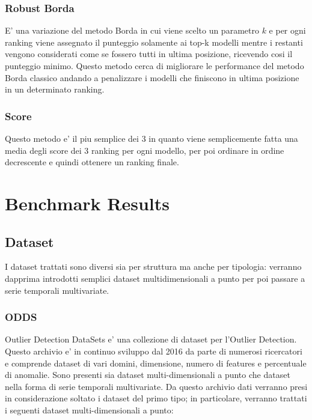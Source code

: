 \subsubsection{Robust Borda}
E' una variazione del metodo Borda in cui viene scelto un parametro $k$ e per ogni ranking viene assegnato il punteggio solamente ai top-k modelli mentre i restanti vengono considerati come se fossero tutti in ultima posizione, ricevendo cosi il punteggio minimo. Questo metodo cerca di migliorare le performance del metodo Borda classico andando a penalizzare i modelli che finiscono in ultima posizione in un determinato ranking.
\subsubsection{Score}
Questo metodo e' il piu semplice dei 3 in quanto viene semplicemente fatta una media degli score dei 3 ranking per ogni modello, per poi ordinare in ordine decrescente e quindi ottenere un ranking finale.

\section{Benchmark Results}
\subsection{Dataset}
I dataset trattati sono diversi sia per struttura ma anche per tipologia: verranno dapprima introdotti semplici dataset multidimensionali a punto per poi passare a serie temporali multivariate. 

\subsubsection{ODDS}
Outlier Detection DataSets e' una collezione di dataset per l'Outlier Detection. Questo archivio e' in continuo sviluppo dal 2016 da parte di numerosi ricercatori e comprende dataset di vari domini, dimensione, numero di features e percentuale di anomalie. 
Sono presenti sia dataset multi-dimensionali a punto che dataset nella forma di serie temporali multivariate. Da questo archivio dati verranno presi in considerazione soltato i dataset del primo tipo; in particolare, verranno trattati i seguenti dataset multi-dimensionali a punto:

